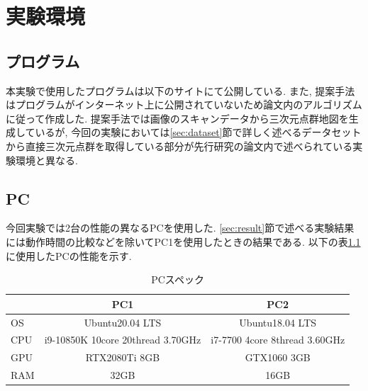 \chapter{実験環境}

\section{プログラム}
本実験で使用したプログラムは以下のサイト\cite{semantic_mesh_localization_link}にて公開している. また, 提案手法\cite{semantic_point_localization}はプログラムがインターネット上に公開されていないため論文内のアルゴリズムに従って作成した. 提案手法では画像のスキャンデータから三次元点群地図を生成しているが, 今回の実験においては\ref{sec:dataset}節で詳しく述べるデータセットから直接三次元点群を取得している部分が先行研究の論文内で述べられている実験環境と異なる.

\section{PC}
今回実験では2台の性能の異なるPCを使用した. \ref{sec:result}節で述べる実験結果には動作時間の比較などを除いてPC1を使用したときの結果である. 以下の表\ref{tab:PC_spec}に使用したPCの性能を示す.

\begin{table}[htbp]
\begin{center}
\caption{PCスペック}
  \begin{tabular}{l c c}\hline
       &  PC1 & PC2 \\ \hline
    OS & Ubuntu20.04 LTS & Ubuntu18.04 LTS\\
    CPU & i9-10850K 10core 20thread 3.70GHz & i7-7700 4core 8thread 3.60GHz\\
    GPU & RTX2080Ti 8GB & GTX1060 3GB\\
    RAM & 32GB & 16GB\\ \hline
  \end{tabular}
  \label{tab:PC_spec}
\end{center}
\end{table}

